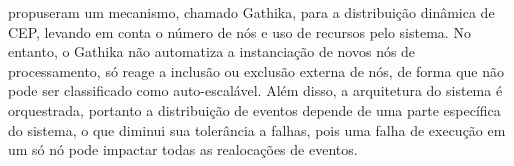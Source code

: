 \cite{randika2018gathika} propuseram um mecanismo, chamado Gathika, para a distribuição dinâmica de CEP, levando em conta o número de nós e uso de recursos pelo sistema. No entanto, o Gathika não automatiza a instanciação de novos nós de processamento, só reage a inclusão ou exclusão externa de nós, de forma que não pode ser classificado como auto-escalável. Além disso, a arquitetura do sistema é orquestrada, portanto a distribuição de eventos depende de uma parte específica do sistema, o que diminui sua tolerância a falhas, pois uma falha de execução em um só nó pode impactar todas as realocações de eventos.















